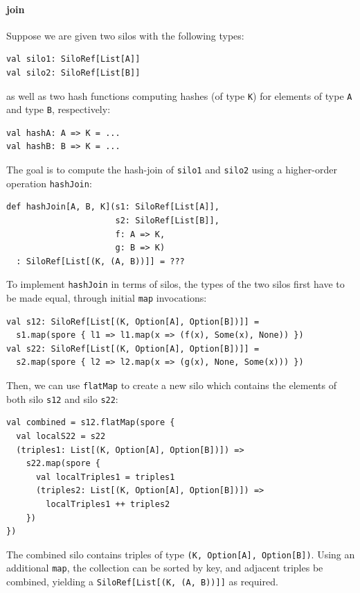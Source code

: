 \documentclass[preprint]{sigplanconf}
\theoremstyle{definition}
\theoremstyle{definition}
\begin{document}
\paragraph{join} Suppose we are given two silos with the following types:

\begin{lstlisting}
val silo1: SiloRef[List[A]]
val silo2: SiloRef[List[B]]
\end{lstlisting}
\noindent
as well as two hash functions computing hashes (of type \verb|K|) for elements of
type \verb|A| and type \verb|B|, respectively:

\begin{lstlisting}
val hashA: A => K = ...
val hashB: B => K = ...
\end{lstlisting}
\noindent
The goal is to compute the hash-join of \verb|silo1| and \verb|silo2| using
a higher-order operation \verb|hashJoin|:

\begin{lstlisting}
def hashJoin[A, B, K](s1: SiloRef[List[A]],
                      s2: SiloRef[List[B]],
                      f: A => K,
                      g: B => K)
  : SiloRef[List[(K, (A, B))]] = ???
\end{lstlisting}
\noindent
To implement \verb|hashJoin| in terms of silos, the types of the two silos first have to be
made equal, through initial \verb|map| invocations:

\begin{lstlisting}
val s12: SiloRef[List[(K, Option[A], Option[B])]] =
  s1.map(spore { l1 => l1.map(x => (f(x), Some(x), None)) })
val s22: SiloRef[List[(K, Option[A], Option[B])]] =
  s2.map(spore { l2 => l2.map(x => (g(x), None, Some(x))) })
\end{lstlisting}
\noindent

Then, we can use \verb|flatMap| to create a new silo which contains the
elements of both silo \verb|s12| and silo \verb|s22|:

\begin{lstlisting}
val combined = s12.flatMap(spore {
  val localS22 = s22
  (triples1: List[(K, Option[A], Option[B])]) =>
    s22.map(spore {
      val localTriples1 = triples1
      (triples2: List[(K, Option[A], Option[B])]) =>
        localTriples1 ++ triples2
    })
})
\end{lstlisting}
\noindent
The combined silo contains triples of type \verb|(K, Option[A], Option[B])|.
Using an additional \verb|map|, the collection can be sorted by key, and
adjacent triples be combined, yielding a \texttt{SiloRef[List[(K, (A, B))]]}
as required.
\end{document}
